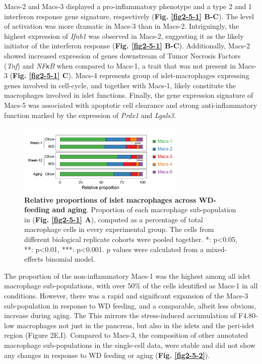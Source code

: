  Macs-2 and Macs-3 displayed a pro-inflammatory phenotype and  a type 2 and 1 interferon response gene signature, respectively (\textbf{Fig. \ref{fig2-5-1} B-C}). The level of activation was more dramatic in Macs-3 than in Macs-2. Intriguingly, the highest expression of \textit{Ifnb1} was observed in Macs-2, suggesting it as the likely initiator of the interferon response (\textbf{Fig. \ref{fig2-5-1} B-C}). Additionally, Macs-2 showed increased expression of genes downstream of Tumor Necrosis Factors (\textit{Tnf}) and \textit{NFκB} when compared to Macs-1, a trait that was not present in Macs-3 (\textbf{Fig. \ref{fig2-5-1} C}). Macs-4 represents group of islet-macrophages expressing genes involved in cell-cycle, and together with Macs-1, likely constitute the macrophages involved in islet functions. Finally, the gene expression signature of Macs-5 was associated with apoptotic cell clearance and strong anti-inflammatory function marked by the expression of \textit{Prdx1} and \textit{Lgals3}.
\clearpage



\begin{figure}
\includegraphics[width=8cm]{Chapter4/Fig/F2-5-03.png}
\caption[res-macs2]{\textbf{Relative proportions of islet macrophages across WD-feeding and aging}. Proportion of each macrophage sub-population in (\textbf{Fig. \ref{fig2-5-1} A}), computed as a percentage of total macrophage cells in every experimental group. The cells from different biological replicate cohorts were pooled together. *: p<0.05, **: p<0.01, ***: p<0.001. p values were calculated from a mixed-effects binomial model.  }
\label{fig:chp2_macs_composition}
\end{figure}

The proportion of the non-inflammatory Macs-1 was the highest among all islet macrophage sub-populations, with over 50\% of the cells identified as Macs-1 in all conditions. However, there was a rapid and significant expansion of the Macs-3 sub-population in response to WD feeding, and a comparable, albeit less obvious, increase during aging. The This mirrors the stress-induced accumulation of F4.80-low macrophages not just in the pancreas, but also in the islets and the peri-islet region (Figure 2E,I). Compared to Macs-3, the composition of other annotated macrophage sub-populations in the single-cell data, were stable and did not show any changes in response to WD feeding or aging (\textbf{Fig. \ref{fig2-5-2}}).

